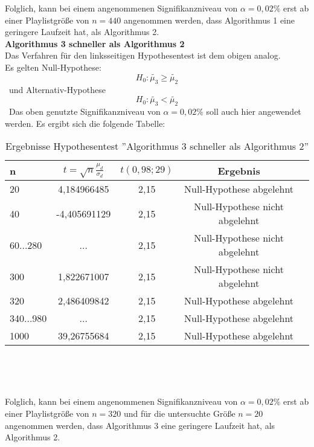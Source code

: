 \documentclass[
10pt, %
a4paper, %
oneside, %
headinclude,footinclude, %
BCOR5mm, %
]{scrartcl}
\begin{document}
Folglich, kann bei einem angenommenen Signifikanzniveau von \(\alpha = 0,02\%\) erst ab einer Playlistgröße von \(n = 440\) angenommen werden, dass Algorithmus 1 eine geringere Laufzeit hat, als Algorithmus 2.\\

\textbf{Algorithmus 3 schneller als Algorithmus 2}\\
Das Verfahren für den linksseitigen Hypothesentest ist dem obigen analog.\\
Es gelten Null-Hypothese:
\begin{equation}
H_0: \tilde{ \mu_3 } \ge \tilde{\mu_2}
\end{equation}\
und Alternativ-Hypothese
\begin{equation}
H_0: \tilde{ \mu_3 } < \tilde{\mu_2}
\end{equation}\
Das oben genutzte Signifikanzniveau von \(\alpha = 0,02\%\) soll auch hier angewendet werden. Es ergibt sich die folgende Tabelle:
\begin{table}[h!]
	\centering 
	\begin{tabular}{|l|c|c|c|c|}
		\hline
		n   &		\(t=\sqrt{n}\frac{\mu_d}{\sigma_d} \)				& \(t(0,98;29)\) &	Ergebnis\\
		\hline
		20   	&	4,184966485	& 2,15 &	Null-Hypothese abgelehnt\\
		\hline
		40   	&	-4,405691129	& 2,15 &	Null-Hypothese nicht abgelehnt\\
		\hline
		60...280   &		...			  & 2,15 &		Null-Hypothese nicht abgelehnt\\
		\hline
		300   &		1,822671007   &	 2,15 &	Null-Hypothese nicht abgelehnt\\
		\hline
		320   &		2,486409842   &	 2,15 &	Null-Hypothese abgelehnt\\
		\hline
		340...980   &		...			  &	 2,15 &	Null-Hypothese abgelehnt\\
		\hline
		1000   &		39,26755684	&  2,15 &	Null-Hypothese abgelehnt\\
		\hline
	\end{tabular}\\
	\caption[]{Ergebnisse Hypothesentest ''Algorithmus 3 schneller als Algorithmus 2''}
\end{table}\

Folglich, kann bei einem angenommenen Signifikanzniveau von \(\alpha = 0,02\%\) erst ab einer Playlistgröße von \(n = 320\) und für die untersuchte Größe \(n = 20\) angenommen werden, dass Algorithmus 3 eine geringere Laufzeit hat, als Algorithmus 2.\\
\end{document}
